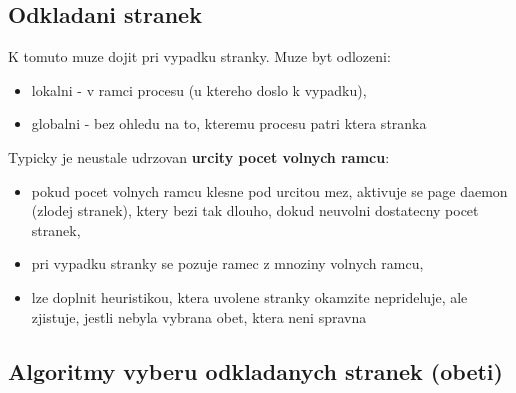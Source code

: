 \documentclass[a4paper, 11pt]{article}
\begin{document}
\subsection{Odkladani stranek}
K tomuto muze dojit pri vypadku stranky. Muze byt odlozeni:
\begin{itemize}
    \item lokalni - v ramci procesu (u ktereho doslo k vypadku),
    \item globalni - bez ohledu na to, kteremu procesu patri ktera stranka \\
\end{itemize}

Typicky je neustale udrzovan \textbf{urcity pocet volnych ramcu}:
\begin{itemize}
    \item pokud pocet volnych ramcu klesne pod urcitou mez, aktivuje se page daemon (zlodej stranek), ktery bezi tak dlouho, dokud neuvolni dostatecny pocet stranek,
    \item pri vypadku stranky se pozuje ramec z mnoziny volnych ramcu,
    \item lze doplnit heuristikou, ktera uvolene stranky okamzite neprideluje, ale zjistuje, jestli nebyla vybrana obet, ktera neni spravna \\
\end{itemize}

\subsection{Algoritmy vyberu odkladanych stranek (obeti)}
\end{document}
